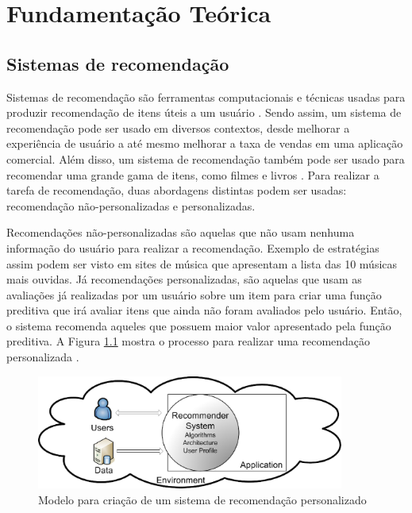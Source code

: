 \chapter[Fundamentação Teórica]{Fundamentação Teórica}

\section{Sistemas de recomendação}

Sistemas de recomendação são ferramentas computacionais e técnicas usadas para
produzir recomendação de itens úteis a um usuário \cite{mahmood2009improving}.
Sendo assim, um sistema de recomendação pode ser usado em diversos contextos,
desde melhorar a experiência de usuário a até mesmo melhorar a taxa de vendas
em uma aplicação comercial. Além disso, um sistema de recomendação também pode
ser usado para recomendar uma grande gama de itens, como filmes e livros
\cite{ricci2011introduction}. Para realizar a tarefa de recomendação, duas abordagens distintas podem ser usadas:
recomendação não-personalizadas e personalizadas.

Recomendações não-personalizadas são aquelas que não usam nenhuma informação do
usuário para realizar a recomendação. Exemplo de estratégias assim podem ser
visto em sites de música que apresentam a lista das 10 músicas mais
ouvidas. Já recomendações personalizadas, são aquelas que usam as avaliações já
realizadas por um usuário sobre um item para criar uma função preditiva que irá avaliar itens que ainda não foram
avaliados pelo usuário. Então, o sistema recomenda aqueles que possuem maior valor
apresentado pela função preditiva. A Figura \ref{fig:modelo_recomendacao} mostra
o processo para realizar uma recomendação personalizada \cite{picault2011get}.

\begin{figure}[h]
  \centering
  \includegraphics[width=0.9\textwidth]{figuras/recommender_model.eps}
  \caption{Modelo para criação de um sistema de recomendação personalizado}
  \label{fig:modelo_recomendacao}
\end{figure}

